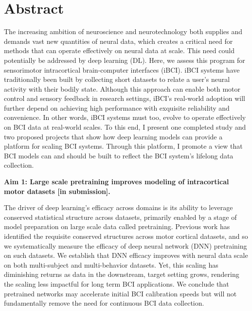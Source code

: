 \documentclass[12pt,oneside]{report}
\begin{document}
\section*{Abstract}
The increasing ambition of neuroscience and neurotechnology both supplies and demands vast new quantities of neural data, which creates a critical need for methods that can operate effectively on neural data at scale.
This need could potentially be addressed by deep learning (DL).
Here, we assess this program for sensorimotor intracortical brain-computer interfaces (iBCI). iBCI systems have traditionally been built by collecting short datasets to relate a user’s neural activity with their bodily state. Although this approach can enable both motor control and sensory feedback in research settings, iBCI's real-world adoption will further depend on achieving high performance with exquisite reliability and convenience. In other words, iBCI systems must too, evolve to operate effectively on BCI data at real-world scales.
To this end, I present one completed study and two proposed projects that show how deep learning models can provide a platform for scaling BCI systems. Through this platform, I promote a view that BCI models can and should be built to reflect the BCI system's lifelong data collection.


\textbf{Aim 1: Large scale pretraining improves modeling of intracortical motor datasets [in submission].}

The driver of deep learning’s efficacy across domains is its ability to leverage conserved statistical structure across datasets, primarily enabled by a stage of model preparation on large scale data called pretraining. Previous work has identified the requisite conserved structures across motor cortical datasets, and so we systematically measure the efficacy of deep neural network (DNN) pretraining on such datasets. We establish that DNN efficacy improves with neural data scale on both multi-subject and multi-behavior datasets. Yet, this scaling has diminishing returns as data in the downstream, target setting grows, rendering the scaling less impactful for long term BCI applications. We conclude that pretrained networks may accelerate initial BCI calibration speeds but will not fundamentally remove the need for continuous BCI data collection.
\end{document}
